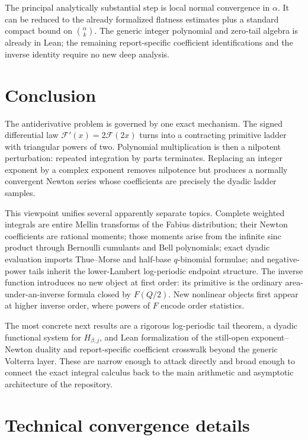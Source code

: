 \documentclass[11pt,oneside]{article}
\theoremstyle{definition}
\theoremstyle{remark}
\newcommand{\1}{\mathbf 1}
\begin{document}
The principal analytically substantial step is local normal convergence in $\alpha$.  It can be
reduced to the already formalized flatness estimates plus a standard compact bound on
$\binom\alpha k$.  The generic integer polynomial and zero-tail algebra is already in Lean;
the remaining report-specific coefficient identifications and the inverse identity require
no new deep analysis.

\section{Conclusion}
\label{p3:sec:conclusion}

The antiderivative problem is governed by one exact mechanism.  The signed differential law
$\mathcal F'(x)=2\mathcal F(2x)$ turns into a contracting primitive ladder with triangular
powers of two.  Polynomial multiplication is then a nilpotent perturbation: repeated
integration by parts terminates.  Replacing an integer exponent by a complex exponent removes
nilpotence but produces a normally convergent Newton series whose coefficients are precisely
the dyadic ladder samples.

This viewpoint unifies several apparently separate topics.  Complete weighted integrals are
entire Mellin transforms of the Fabius distribution; their Newton coefficients are rational
moments; those moments arise from the infinite sinc product through Bernoulli cumulants and
Bell polynomials; exact dyadic evaluation imports Thue--Morse and half-base $q$-binomial
formulae; and negative-power tails inherit the lower-Lambert log-periodic endpoint structure.
The inverse function introduces no new object at first order: its primitive is the ordinary
area-under-an-inverse formula closed by $F(Q/2)$.  New nonlinear objects first appear at
higher inverse order, where powers of $F$ encode order statistics.

The most concrete next results are a rigorous log-periodic tail theorem, a dyadic functional
system for $H_{\beta,j}$, and Lean formalization of the still-open exponent--Newton duality
and report-specific coefficient crosswalk beyond the generic Volterra layer.  These are
narrow enough to attack directly and broad enough to connect the exact
integral calculus back to the main arithmetic and asymptotic architecture of the repository.

\appendix

\section{Technical convergence details}
\label{p3:app:convergence}
\end{document}
